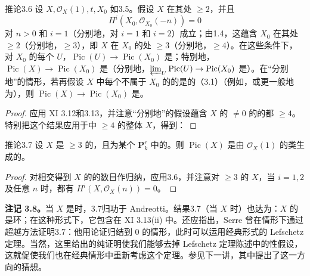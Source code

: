 \begin{SGAresult}{推论}{3.6}
设 $X,\mathcal O_X(1),t,X_0$ 如3.5。假设 $X$ 在其处 $\geq2$，并且
\[
 H^i(X_0,\mathcal O_{X_0}(-n))=0
\]
对 $n>0$ 和 $i=1$（分别地，对 $i=1$ 和 $i=2$）成立；由1.4，这蕴含 $X_0$ 在其处 $\geq2$（分别地，$\geq3$），即 $X$ 在 $X_0$ 的处 $\geq3$（分别地，$\geq4$）。在这些条件下，对 $X_0$ 的每个 $U$，$\operatorname{Pic}(U)\to\operatorname{Pic}(X_0)$ 是；特别地，$\operatorname{Pic}(X)\to\operatorname{Pic}(X_0)$ 是（分别地，$\varprojlim_U\operatorname{Pic}(U)\to\operatorname{Pic}(X_0)$ 是）。在“分别地”的情形，若再假设 $X$ 中每个不属于 $X_0$ 的的是的（3.1）（例如，或更一般地为），则 $\operatorname{Pic}(X)\to\operatorname{Pic}(X_0)$ 是。
\end{SGAresult}
\begin{proof}
应用 XI 3.12和3.13，并注意“分别地”的假设蕴含 $X$ 的 $\neq0$ 的的都 $\geq4$。特别把这个结果应用于中 $\geq4$ 的整体 $X$，得到：
\end{proof}
\begin{SGAresult}{推论}{3.7}
设 $X$ 是 $\geq3$ 的，且为某个 $\mathbf P_k^r$ 中的。则 $\operatorname{Pic}(X)$ 是由 $\mathcal O_X(1)$ 的类生成的。
\end{SGAresult}
\begin{proof}
对相交得到 $X$ 的的数目作归纳，应用3.6，并注意对 $\geq3$ 的 $X$，当 $i=1,2$ 及任意 $n$ 时，都有 $H^i(X,\mathcal O_X(n))=0$。
\end{proof}
\textbf{注记 3.8。}当 $X$ 是时，3.7归功于 Andreotti。结果3.7（当 $X$ 时）也达为：$X$ 的是环；在这种形式下，它包含在 XI 3.13(ii) 中。还应指出，Serre 曾在情形下通过超越方法证明3.7：他用论证归结到 $0$ 的情形，此时可以运用经典形式的 Lefschetz 定理。当然，这里给出的纯证明使我们能够去掉 Lefschetz 定理陈述中的性假设，这就促使我们也在经典情形中重新考虑这个定理。参见下一讲，其中提出了这一方向的猜想。

